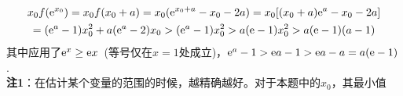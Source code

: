 \begin{enumerate}[label={【\textbf{例\thechapter.\arabic*}】},
 leftmargin=\inteval{\myenumleftmargin}pt,
 itemsep=\inteval{\myenumitempsep}pt,
 itemindent=\inteval{\myenumitemindent}pt]
\begin{gather*}
    x_0f(\mathrm{e}^{x_0})=x_0f(x_0+a)=x_0(\mathrm{e}^{x_0+a}-x_0-2a)=x_0[(x_0+a)\mathrm{e}^a-x_0-2a]\\
    =(\mathrm{e}^a-1)x_0^2+a(\mathrm{e}^a-2)x_0 >(\mathrm{e}^a-1)x_0^2>a(\mathrm{e}-1)x_0^2>a(\mathrm{e}-1)(a-1)
\end{gather*}
其中应用了$ \mathrm{e}^x\geq \mathrm{e} x $\ (等号仅在$ x=1 $处成立)，$ \mathrm{e}^a-1>\mathrm{e} a-1>\mathrm{e} a-a=a(\mathrm{e}-1) $. \\
%
\textbf{注1}：在估计某个变量的范围的时候，越精确越好。对于本题中的$ x_0 $，其最小值

\end{enumerate}
